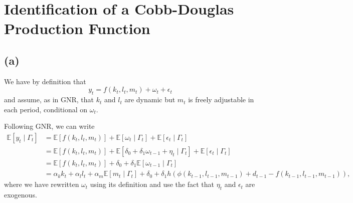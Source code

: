 \documentclass[11pt]{article}
\author{Vaidehi Parameswaran}
\date{\today}
\begin{document}
\section{Identification of a Cobb-Douglas Production Function}
\subsection*{(a)}
We have by definition that
\[y_t = f(k_t, l_t, m_t) + \omega_t + \epsilon_t\]
and assume, as in GNR, that $k_t$ and $l_t$ are dynamic but $m_t$ is freely adjustable in each period, conditional on $\omega_t$. 

Following GNR, we can write
\begin{align*}
    \mathbb{E}[y_t \mid \Gamma_t] & = \mathbb{E}[f(k_t, l_t, m_t)] + \mathbb{E}[\omega_t \mid \Gamma_t] + \mathbb{E}[\epsilon_t \mid \Gamma_t] \\
                        & = \mathbb{E}[f(k_t, l_t, m_t)] + \mathbb{E}[\delta_0 + \delta_1 \omega_{t-1} + \eta_t \mid \Gamma_t] + \mathbb{E}[\epsilon_t \mid \Gamma_t] \\
                        & = \mathbb{E}[f(k_t, l_t, m_t)] + \delta_0 + \delta_1 \mathbb{E}[\omega_{t-1} \mid \Gamma_t] \\
                        & = \alpha_k k_t + \alpha_l l_t + \alpha_m \mathbb{E}[m_t \mid \Gamma_t] + \delta_0 + \delta_1 h(\phi(k_{t-1}, l_{t-1}, m_{t-1}) + d_{t-1} - f(k_{t-1}, l_{t-1}, m_{t-1})),
\end{align*}
where we have rewritten $\omega_t$ using its definition and use the fact that $\eta_t$ and $\epsilon_t$ are exogenous.
\end{document}
